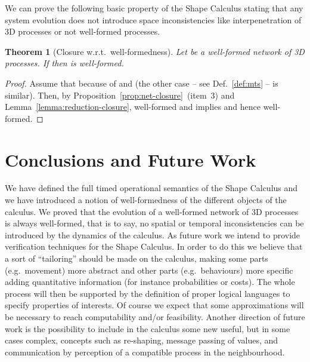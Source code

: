 \documentclass[11pt]{article}
\newtheorem{theorem}{Theorem}
\begin{document}
\medskip

We can prove the following basic property of the Shape Calculus stating that any system evolution
does not introduce space inconsistencies like interpenetration of 3D processes or not well-formed
processes.

\begin{theorem}[Closure w.r.t.\ well-formedness]
Let  be a well-formed network of 3D processes. If  then  is
well-formed.
\end{theorem}

\begin{proof}
Assume that  because of   and  (the other case  -- see Def.~\ref{def:mts} -- is similar). Then, by
Proposition~\ref{prop:net-closure}~(item~3) and Lemma~\ref{lemma:reduction-closure},   well-formed and
 implies   and hence  well-formed.
\end{proof}


\section{Conclusions and Future Work}
\label{sec:conclusion}

We have defined the full timed operational semantics of the Shape Calculus and we have introduced a notion of well-formedness of the different objects of the calculus. We proved that the evolution of a well-formed network of 3D processes is always well-formed, that is to say, no spatial or temporal inconsistencies can be introduced by the dynamics of the calculus. As future work we intend to provide verification techniques for the Shape Calculus. In order to do this we believe that a sort of ``tailoring'' should be made on the calculus, making some parts (e.g.\ movement) more abstract and other parts (e.g.\ behaviours) more specific adding quantitative information (for instance probabilities or costs). The whole process will then be supported by the definition of proper logical languages to specify properties of interests. Of course we expect that some approximations will be necessary to reach computability and/or feasibility. Another direction of future work is the possibility to include in the calculus some new useful, but in some cases complex, concepts such as re-shaping, message passing of values, and communication by perception of a compatible process in the neighbourhood.




\newpage
\end{document}
